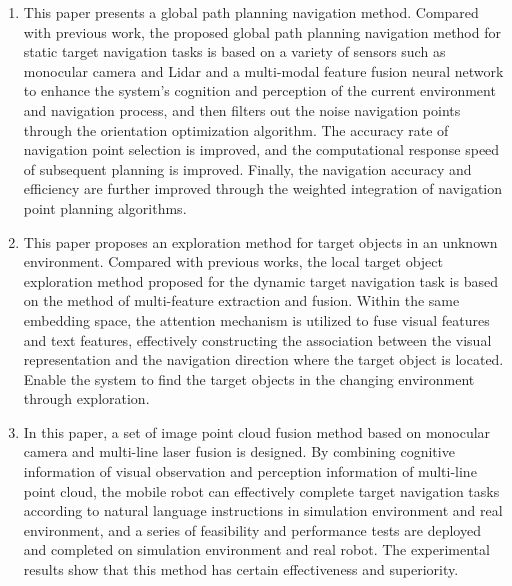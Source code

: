     \begin{enumerate}[topsep = 0 pt, itemsep= 0 pt, parsep=0pt, partopsep=0pt, leftmargin=44pt, itemindent=0pt, labelsep=6pt, label=(\arabic*)]
        \item 	This paper presents a global path planning navigation method. Compared with previous work, the proposed global path planning navigation method for static target navigation tasks is based on a variety of sensors such as monocular camera and Lidar and a multi-modal feature fusion neural network to enhance the system's cognition and perception of the current environment and navigation process, and then filters out the noise navigation points through the orientation optimization algorithm. The accuracy rate of navigation point selection is improved, and the computational response speed of subsequent planning is improved. Finally, the navigation accuracy and efficiency are further improved through the weighted integration of navigation point planning algorithms.
        \item	This paper proposes an exploration method for target objects in an unknown environment. Compared with previous works, the local target object exploration method proposed for the dynamic target navigation task is based on the method of multi-feature extraction and fusion. Within the same embedding space, the attention mechanism is utilized to fuse visual features and text features, effectively constructing the association between the visual representation and the navigation direction where the target object is located. Enable the system to find the target objects in the changing environment through exploration.
        \item	In this paper, a set of image point cloud fusion method based on monocular camera and multi-line laser fusion is designed. By combining cognitive information of visual observation and perception information of multi-line point cloud, the mobile robot can effectively complete target navigation tasks according to natural language instructions in simulation environment and real environment, and a series of feasibility and performance tests are deployed and completed on simulation environment and real robot. The experimental results show that this method has certain effectiveness and superiority.
    \end{enumerate}


